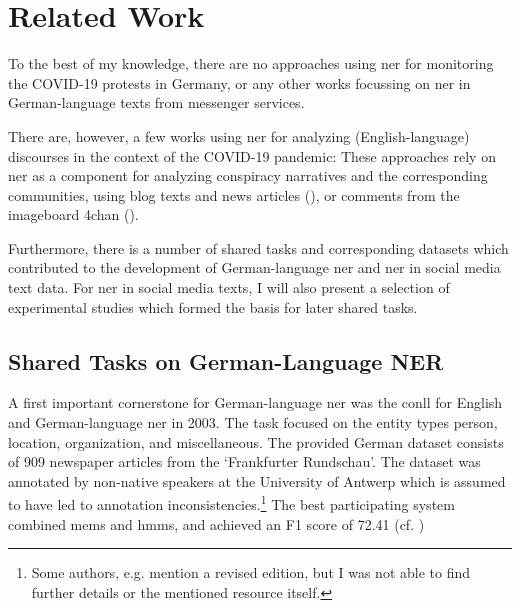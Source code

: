 \chapter{Related Work}
\label{cha:related_work}

To the best of my knowledge, there are no approaches using \gls{ner} for monitoring the COVID-19 protests in Germany, or any other works focussing on \gls{ner} in German-language texts from messenger services. 

There are, however, a few works using \gls{ner} for analyzing (English-language) discourses in the context of the COVID-19 pandemic: These approaches rely on \gls{ner} as a component for analyzing conspiracy narratives and the corresponding communities, using blog texts and news articles (\cite{tangherlini_automated_2020}), or comments from the imageboard 4chan (\cite{shahsavari_conspiracy_2020}). 

Furthermore, there is a number of shared tasks and corresponding datasets which contributed to the development of German-language \gls{ner} and \gls{ner} in social media text data. For \gls{ner} in social media texts, I will also present a selection of experimental studies which formed the basis for later shared tasks. 

\section{Shared Tasks on German-Language NER}
A first important cornerstone for German-language \gls{ner} was the \gls{conll} for English and German-language \gls{ner} in 2003. The task focused on the entity types person, location, organization, and miscellaneous. The provided German dataset consists of 909 newspaper articles from the `Frankfurter Rundschau'. 
The dataset was annotated by non-native speakers at the University of Antwerp which is assumed to have led to annotation inconsistencies.\footnote{Some authors, e.g. \cite{schweter2020flert} mention a revised edition, but I was not able to find further details or the mentioned resource itself.}
The best participating system combined \glspl{mem} and \glspl{hmm}, and achieved an F1 score of 72.41 (cf. \cite{tjong_kim_sang_introduction_2003})

